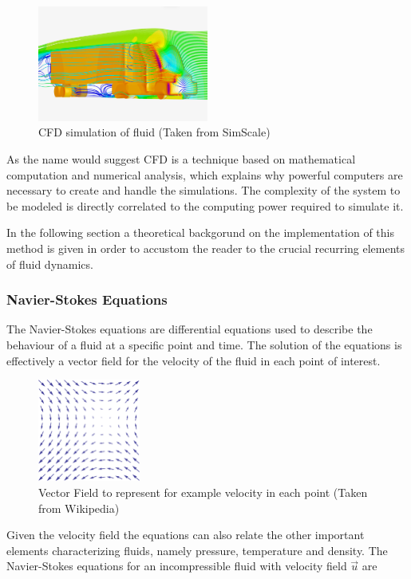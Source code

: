 \documentclass[]{usiinfbachelorproject}
\begin{document}
\begin{figure} [h]
    \centering
    \includegraphics[width=0.5\textwidth]{CFD.png}
    \caption{CFD simulation of fluid (Taken from SimScale)}
    \label{fig:CFDsim}
\end{figure}

As the name would suggest CFD is a technique based on mathematical computation and numerical analysis, which explains why 
powerful computers are necessary to create and handle the simulations. The complexity of the system to be modeled is directly 
correlated to the computing power required to simulate it.

In the following section a theoretical backgorund on the implementation of this method is given in 
order to accustom the reader to the crucial recurring elements of fluid dynamics.

\subsubsection{Navier-Stokes Equations}
The Navier-Stokes equations are differential equations used to describe the behaviour of a fluid at a specific 
point and time. The solution of the equations is effectively a vector field for the velocity of the fluid in each point of interest.
\begin{figure} [h]
    \centering
    \includegraphics[width=0.3\textwidth]{VectorField.png}
    \caption{Vector Field to represent for example velocity in each point (Taken from Wikipedia)}
    \label{fig:VectorField}
\end{figure}
Given the velocity field the equations can also relate the other important elements characterizing fluids, namely pressure, 
temperature and density. The Navier-Stokes equations for an incompressible fluid with velocity field $\vec{u}$ are 
\end{document}
